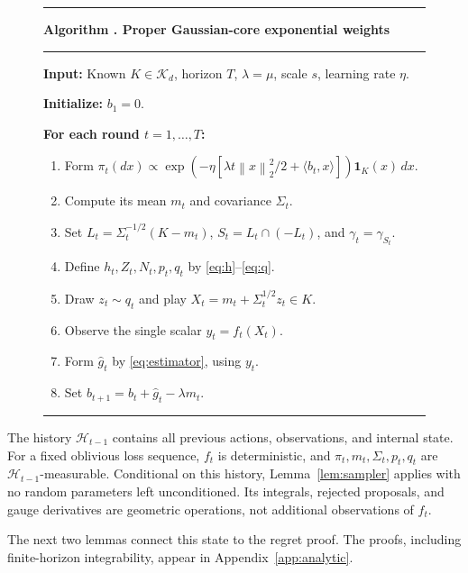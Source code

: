 \documentclass[11pt]{article}
\numberwithin{equation}{section}
\newcommand{\ip}[2]{\langle #1,#2\rangle}
\newcommand{\norm}[1]{\left\|#1\right\|}
\newcommand{\cK}{\mathcal K}
\newcounter{algorithm}
\theoremstyle{definition}
\theoremstyle{remark}
\begin{document}
\begin{figure}[tbp]
\begin{minipage}{\textwidth}
\small
\hrule\vspace{6pt}
\label{alg:main}
\noindent\textbf{Algorithm \thealgorithm. Proper Gaussian-core exponential weights}
\par\vspace{5pt}\hrule\vspace{6pt}
\noindent\textbf{Input:} Known $K\in\cK_d$, horizon $T$, $\lambda=\mu$,
scale $s$, learning rate $\eta$.\par
\noindent\textbf{Initialize:} $b_1=0$.\par
\noindent\textbf{For each round $t=1,\ldots,T$:}
\begin{enumerate}[label=\arabic*.,leftmargin=1.8em,itemsep=3pt,topsep=4pt]
 \item Form $\pi_t(dx)\propto
   \exp\!\left(-\eta[\lambda t\norm{x}_2^2/2+\ip{b_t}x]\right)\mathbf1_K(x)\,dx$.
 \item Compute its mean $m_t$ and covariance $\Sigma_t$.
 \item Set $L_t=\Sigma_t^{-1/2}(K-m_t)$, $S_t=L_t\cap(-L_t)$,
   and $\gamma_t=\gamma_{S_t}$.
 \item Define $h_t,Z_t,N_t,p_t,q_t$ by \eqref{eq:h}--\eqref{eq:q}.
 \item Draw $z_t\sim q_t$ and play $X_t=m_t+\Sigma_t^{1/2}z_t\in K$.
 \item Observe the single scalar $y_t=f_t(X_t)$.
 \item Form $\widehat g_t$ by \eqref{eq:estimator}, using $y_t$.
 \item Set $b_{t+1}=b_t+\widehat g_t-\lambda m_t$.
\end{enumerate}
\vspace{2pt}\hrule
\end{minipage}
\end{figure}

The history $\mathcal H_{t-1}$ contains all previous actions, observations, and
internal state. For a fixed oblivious loss sequence, $f_t$ is deterministic,
and $\pi_t,m_t,\Sigma_t,p_t,q_t$ are $\mathcal H_{t-1}$-measurable. Conditional
on this history, Lemma~\ref{lem:sampler} applies with no random parameters left
unconditioned. Its integrals, rejected proposals, and gauge derivatives are
geometric operations, not additional observations of $f_t$.

The next two lemmas connect this state to the regret proof.
The proofs, including finite-horizon integrability, appear in
Appendix~\ref{app:analytic}.
\end{document}
